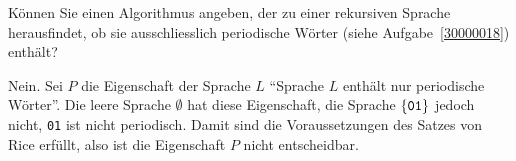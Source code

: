 Können Sie einen Algorithmus angeben, der zu einer rekursiven
Sprache herausfindet, ob sie ausschliesslich periodische Wörter (siehe
Aufgabe~\ref{30000018})
enthält?


\begin{loesung}
Nein. Sei
$P$ die Eigenschaft der Sprache $L$ ``Sprache $L$ enthält
nur periodische Wörter''. Die leere Sprache $\emptyset$
hat diese Eigenschaft, die Sprache $\{{\tt 01}\}$ jedoch nicht,
{\tt 01} ist nicht periodisch.
Damit sind die Voraussetzungen des Satzes von Rice erfüllt, also
ist die Eigenschaft $P$ nicht entscheidbar.
\end{loesung}
